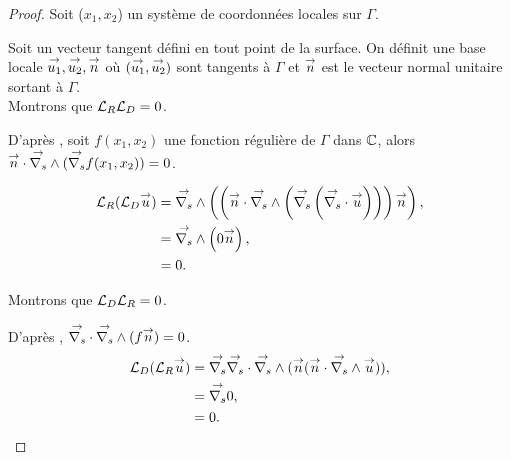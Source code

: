   \begin{proof}
    Soit (\(x_1,x_2\)) un système de coordonnées locales sur \(\Gamma\).

    Soit un vecteur tangent défini en tout point de la surface. On définit une base locale \(\vect{u_1},\vect{u_2},\vect{n}\) où \((\vect{u_1},\vect{u_2})\) sont tangents à \(\Gamma\) et \(\vn\) est le vecteur normal unitaire sortant à \(\Gamma\).
    \\


    Montrons que \(\LR\LD = 0\).

    D’après \cite[propriété A3.42, p.~1029]{bladel_electromagnetic_2007}, 
    soit \(f(x_1,x_2)\) une fonction régulière de \(\Gamma\) dans \(\CC\), alors \(\vn \cdot \vrots(\vgrads f(x_1,x_2)) = 0\).

    \begin{align*}
      \LR(\LD \vu) &= \vrots \left(\left(\vn \cdot \vrots \left( \vgrads \left(\vdivs \vu\right)\right)\right)\vn \right),
      \\
      &= \vrots \left(0\vn \right), 
      \\
      &= 0.
    \end{align*}

    Montrons que \(\LD\LR = 0\).

    D’après \cite[p.~1029, A3.43]{bladel_electromagnetic_2007}, \(\vdivs \vrots (f\vn) = 0\).
    \begin{align*}
      \LD(\LR \vu) &= \vgrads \vdivs \vrots (\vn (\vn \cdot \vrots \vu)),
      \\
      &= \vgrads 0,
      \\
      &= 0.
    \end{align*}
  \end{proof}

